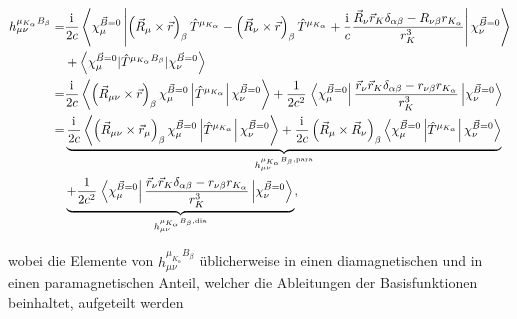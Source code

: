     \begin{equation}
    \begin{aligned}    
    h_{\mu\nu}^{\mu_{K_\alpha}B_\beta}=&\frac{\mathrm{i}\mkern1mu}{2c}\left\langle\chi_\mu^{\vec{B}=0}\left\vert\left(\vec{R}_\mu\times\vec{r}\right)_\beta\hat{T}^{\mu_{K_\alpha}}-\left(\vec{R}_\nu\times\vec{r}\right)_\beta \hat{T}^{\mu_{K_\alpha}}+\frac{\mathrm{i}\mkern1mu}{c}\frac{\vec{R}_\nu\vec{r}_K\delta_{\alpha\beta}-R_{\nu \beta}r_{K_\alpha}}{r_K^3}\right\vert\chi_\nu^{\vec{B}=0}\right\rangle\\
    &+\left\langle\chi_\mu^{\vec{B}=0}\vert\hat{T}^{\mu_{K_\alpha}B_\beta}\vert\chi_\nu^{\vec{B}=0}\right\rangle\\
    =&\frac{\mathrm{i}\mkern1mu}{2c}\left\langle\left(\vec{R}_{\mu\nu}\times\vec{r}\right)_\beta\chi_\mu^{\vec{B}=0}\left\vert\hat{T}^{\mu_{K_\alpha}}\right\vert\chi_\nu^{\vec{B}=0}\right\rangle+\frac{1}{2c^2}\left.\left\langle\chi_\mu^{\vec{B}=0}\right\vert\frac{\vec{r}_\nu\vec{r}_K\delta_{\alpha\beta}-r_{\nu \beta}r_{K_\alpha}}{r_K^3}\left\vert\chi_\nu^{\vec{B}=0}\right\rangle\right.\\
    =&\underbrace{\frac{\mathrm{i}\mkern1mu}{2c}\left\langle\left(\vec{R}_{\mu\nu}\times\vec{r}_\mu\right)_\beta\chi_\mu^{\vec{B}=0}\left\vert\hat{T}^{\mu_{K_\alpha}}\right\vert\chi_\nu^{\vec{B}=0}\right\rangle +\frac{\mathrm{i}\mkern1mu}{2c}\left(\vec{R}_{\mu}\times\vec{R}_\nu\right)_\beta\left\langle\chi_\mu^{\vec{B}=0}\left\vert\hat{T}^{\mu_{K_\alpha}}\right\vert\chi_\nu^{\vec{B}=0}\right\rangle}_{h_{\mu\nu}^{\mu_{K_\alpha}B_\beta,\textrm{para}}} \\
    &\underbrace{+\frac{1}{2c^2}\left.\left\langle\chi_\mu^{\vec{B}=0}\right\vert\frac{\vec{r}_\nu\vec{r}_K\delta_{\alpha\beta}-r_{\nu \beta}r_{K_\alpha}}{r_K^3}\left\vert\chi_\nu^{\vec{B}=0}\right\rangle\right.}_{h_{\mu\nu}^{\mu_{K_\alpha}B_\beta,\textrm{dia}}},
    \end{aligned}
    \end{equation}
     
     wobei die Elemente von $h_{\mu\nu}^{\mu_{K_\alpha}B_\beta}$ üblicherweise in einen diamagnetischen und in einen paramagnetischen Anteil, welcher die Ableitungen der Basisfunktionen beinhaltet, aufgeteilt werden
     
